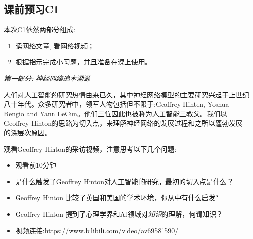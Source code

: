 \documentclass[12pt]{article}
\numberwithin{figure}{section}
\numberwithin{equation}{section}
\begin{document}


\setcounter{section}{3}
\setcounter{subsection}{0}
\subsection{课前预习C1}

本次C1依然两部分组成:
\begin{enumerate}
	\item 读网络文章, 看网络视频；
	\item 根据指示完成小习题，并且准备在课上使用。
\end{enumerate}

\noindent
\textit{第一部分: 神经网络追本溯源}

人们对人工智能的研究热情由来已久，其中神经网络模型的主要研究兴起于上世纪八十年代。众多研究者中，领军人物包括但不限于:Geoffrey Hinton,  Yoshua Bengio and Yann LeCun。他们三位因此也被称为人工智能三教父。我们以Geoffrey Hinton的思路为切入点，来理解神经网络的发展过程和之所以蓬勃发展的深层次原因。

观看Geoffrey Hinton的采访视频，注意思考以下几个问题:
\begin{itemize}
	\item 观看前10分钟
	\item 是什么触发了Geoffrey Hinton对人工智能的研究，最初的切入点是什么？
	\item Geoffrey Hinton 比较了英国和美国的学术环境，你从中有什么启发?
	\item Geoffrey Hinton 提到了心理学界和AI领域对\textit{知识}的理解，何谓知识？
	\item 视频连接:\url{https://www.bilibili.com/video/av69581590/}
\end{itemize}

\end{document}
